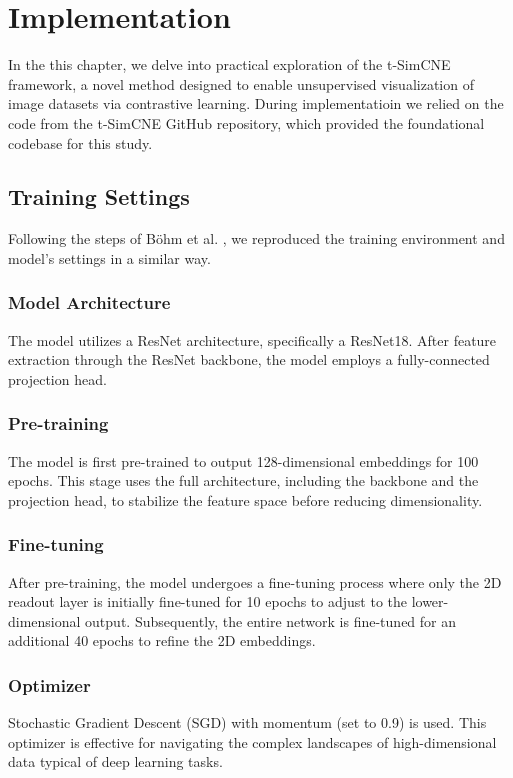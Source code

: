 \chapter{Implementation}

In the this chapter, we delve into practical exploration of the t-SimCNE framework, a novel method designed to enable unsupervised visualization of image datasets via contrastive learning. During implementatioin we relied on the code from the t-SimCNE GitHub repository, which provided the foundational codebase for this study.

\section{Training Settings}

Following the steps of Böhm et al. \cite{tsimcne}, we reproduced the training environment and model's settings in a similar way.

\subsection{Model Architecture}

The model utilizes a ResNet architecture, specifically a ResNet18. After feature extraction through the ResNet backbone, the model employs a fully-connected projection head.

\subsection{Pre-training}
The model is first pre-trained to output 128-dimensional embeddings for 100 epochs. This stage uses the full architecture, including the backbone and the projection head, to stabilize the feature space before reducing dimensionality.

\subsection{Fine-tuning}
After pre-training, the model undergoes a fine-tuning process where only the 2D readout layer is initially fine-tuned for 10 epochs to adjust to the lower-dimensional output. Subsequently, the entire network is fine-tuned for an additional 40 epochs to refine the 2D embeddings.

\subsection{Optimizer}
Stochastic Gradient Descent (SGD) with momentum (set to 0.9) is used. This optimizer is effective for navigating the complex landscapes of high-dimensional data typical of deep learning tasks.


